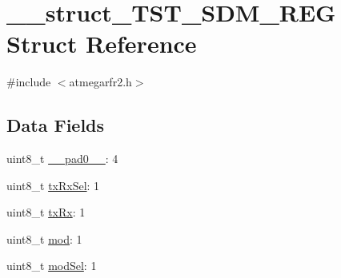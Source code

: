 \hypertarget{struct____struct___t_s_t___s_d_m___r_e_g}{\section{\-\_\-\-\_\-struct\-\_\-\-T\-S\-T\-\_\-\-S\-D\-M\-\_\-\-R\-E\-G Struct Reference}
\label{struct____struct___t_s_t___s_d_m___r_e_g}
}


{\ttfamily \#include $<$atmegarfr2.\-h$>$}

\subsection*{Data Fields}
\begin{DoxyCompactItemize}
\item 
uint8\-\_\-t \hyperlink{struct____struct___t_s_t___s_d_m___r_e_g_a63b491db14376192c9de77d903f210c5}{\-\_\-\-\_\-pad0\-\_\-\-\_\-}\-: 4
\item 
uint8\-\_\-t \hyperlink{struct____struct___t_s_t___s_d_m___r_e_g_afc9879f4cc5319a0b63d1536be751e57}{tx\-Rx\-Sel}\-: 1
\item 
uint8\-\_\-t \hyperlink{struct____struct___t_s_t___s_d_m___r_e_g_ac8cfe9fba1870ac104b9174358e213c6}{tx\-Rx}\-: 1
\item 
uint8\-\_\-t \hyperlink{struct____struct___t_s_t___s_d_m___r_e_g_a8224363c7b0fc848ba8d03239cc86df2}{mod}\-: 1
\item 
uint8\-\_\-t \hyperlink{struct____struct___t_s_t___s_d_m___r_e_g_a543f9eeee3aa874ac8fb88250b977bb7}{mod\-Sel}\-: 1
\end{DoxyCompactItemize}


